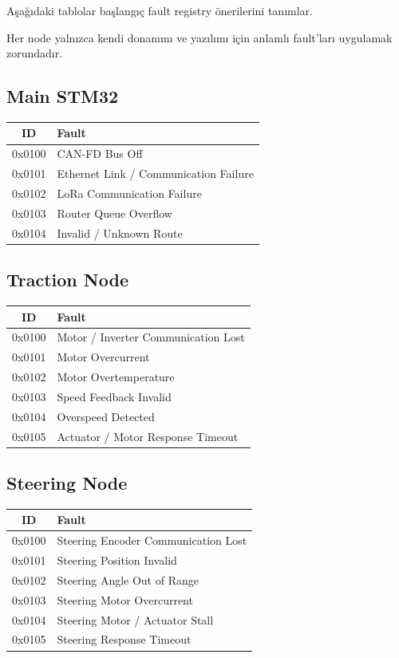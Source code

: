 \documentclass[a4paper,11pt]{article}
\begin{document}
Aşağıdaki tablolar başlangıç fault registry önerilerini tanımlar.

Her node yalnızca kendi donanımı ve yazılımı için anlamlı fault'ları
uygulamak zorundadır.

\subsection{Main STM32}

\begin{center}
\begin{tabular}{c l}
\toprule
\textbf{ID} & \textbf{Fault} \\
\midrule
0x0100 & CAN-FD Bus Off \\
0x0101 & Ethernet Link / Communication Failure \\
0x0102 & LoRa Communication Failure \\
0x0103 & Router Queue Overflow \\
0x0104 & Invalid / Unknown Route \\
\bottomrule
\end{tabular}
\end{center}

\subsection{Traction Node}

\begin{center}
\begin{tabular}{c l}
\toprule
\textbf{ID} & \textbf{Fault} \\
\midrule
0x0100 & Motor / Inverter Communication Lost \\
0x0101 & Motor Overcurrent \\
0x0102 & Motor Overtemperature \\
0x0103 & Speed Feedback Invalid \\
0x0104 & Overspeed Detected \\
0x0105 & Actuator / Motor Response Timeout \\
\bottomrule
\end{tabular}
\end{center}

\subsection{Steering Node}

\begin{center}
\begin{tabular}{c l}
\toprule
\textbf{ID} & \textbf{Fault} \\
\midrule
0x0100 & Steering Encoder Communication Lost \\
0x0101 & Steering Position Invalid \\
0x0102 & Steering Angle Out of Range \\
0x0103 & Steering Motor Overcurrent \\
0x0104 & Steering Motor / Actuator Stall \\
0x0105 & Steering Response Timeout \\
\bottomrule
\end{tabular}
\end{center}
\end{document}
